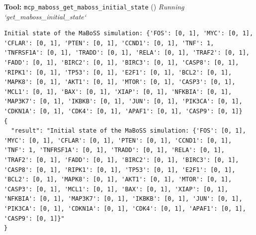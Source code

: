 \documentclass[11pt,a4paper]{article}
\begin{document}
\begin{toolokbox}
\textbf{Tool:} \texttt{mcp\_maboss\_get\_maboss\_initial\_state} (\checkmark)
\textit{Running `get\_maboss\_initial\_state`}
\begin{lstlisting}
Initial state of the MaBoSS simulation: {'FOS': [0, 1], 'MYC': [0, 1], 'CFLAR': [0, 1], 'PTEN': [0, 1], 'CCND1': [0, 1], 'TNF': 1, 'TNFRSF1A': [0, 1], 'TRADD': [0, 1], 'RELA': [0, 1], 'TRAF2': [0, 1], 'FADD': [0, 1], 'BIRC2': [0, 1], 'BIRC3': [0, 1], 'CASP8': [0, 1], 'RIPK1': [0, 1], 'TP53': [0, 1], 'E2F1': [0, 1], 'BCL2': [0, 1], 'MAPK8': [0, 1], 'AKT1': [0, 1], 'MTOR': [0, 1], 'CASP3': [0, 1], 'MCL1': [0, 1], 'BAX': [0, 1], 'XIAP': [0, 1], 'NFKBIA': [0, 1], 'MAP3K7': [0, 1], 'IKBKB': [0, 1], 'JUN': [0, 1], 'PIK3CA': [0, 1], 'CDKN1A': [0, 1], 'CDK4': [0, 1], 'APAF1': [0, 1], 'CASP9': [0, 1]}
{
  "result": "Initial state of the MaBoSS simulation: {'FOS': [0, 1], 'MYC': [0, 1], 'CFLAR': [0, 1], 'PTEN': [0, 1], 'CCND1': [0, 1], 'TNF': 1, 'TNFRSF1A': [0, 1], 'TRADD': [0, 1], 'RELA': [0, 1], 'TRAF2': [0, 1], 'FADD': [0, 1], 'BIRC2': [0, 1], 'BIRC3': [0, 1], 'CASP8': [0, 1], 'RIPK1': [0, 1], 'TP53': [0, 1], 'E2F1': [0, 1], 'BCL2': [0, 1], 'MAPK8': [0, 1], 'AKT1': [0, 1], 'MTOR': [0, 1], 'CASP3': [0, 1], 'MCL1': [0, 1], 'BAX': [0, 1], 'XIAP': [0, 1], 'NFKBIA': [0, 1], 'MAP3K7': [0, 1], 'IKBKB': [0, 1], 'JUN': [0, 1], 'PIK3CA': [0, 1], 'CDKN1A': [0, 1], 'CDK4': [0, 1], 'APAF1': [0, 1], 'CASP9': [0, 1]}"
}
\end{lstlisting}
\end{toolokbox}
\end{document}
